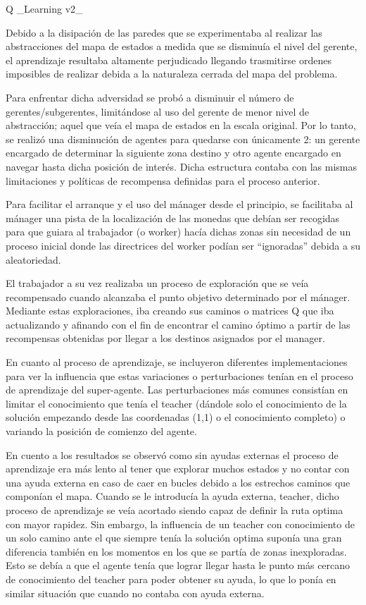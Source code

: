 \documentclass[letterpaper]{article} %
\begin{document}
Q _Learning  v2_

Debido a la disipación de las paredes que se experimentaba al realizar las abstracciones del mapa de estados a medida que se disminuía el nivel del gerente, el aprendizaje resultaba altamente perjudicado llegando trasmitirse ordenes imposibles de realizar debida a la naturaleza cerrada del mapa del problema.

Para enfrentar dicha adversidad se probó a disminuir el número de gerentes/subgerentes, limitándose al uso del gerente de menor nivel de abstracción; aquel que veía el mapa de estados en la escala original. Por lo tanto, se realizó una disminución de agentes para quedarse con únicamente 2: un gerente encargado de determinar la siguiente zona destino y otro agente encargado en navegar hasta dicha posición de interés. Dicha estructura contaba con las mismas limitaciones y políticas de recompensa definidas para el proceso anterior.


Para facilitar el arranque y el uso del mánager desde el principio, se facilitaba al mánager una pista de la localización de las monedas que debían ser recogidas para que guiara al trabajador (o worker) hacía dichas zonas sin necesidad de un proceso inicial donde las directrices del worker podían ser “ignoradas” debida a su aleatoriedad. 

El trabajador a su vez realizaba un proceso de exploración que se veía recompensado cuando alcanzaba el punto objetivo determinado por el mánager. Mediante estas exploraciones, iba creando sus caminos o matrices Q que iba actualizando y afinando con el fin de encontrar el camino óptimo a partir de las recompensas obtenidas por llegar a los destinos asignados por el manager.

En cuanto al proceso de aprendizaje, se incluyeron diferentes implementaciones para ver la influencia que estas variaciones o perturbaciones tenían en el proceso de aprendizaje del super-agente. Las perturbaciones más comunes consistían en limitar el conocimiento que tenía el teacher (dándole solo el conocimiento de la solución empezando desde las coordenadas (1,1) o el conocimiento completo) o variando la posición de comienzo del agente.

En cuento a los resultados se observó como sin ayudas externas el proceso de aprendizaje era más lento al tener que explorar muchos estados y no contar con una ayuda externa en caso de caer en bucles debido a los estrechos caminos que componían el mapa. Cuando se le introducía la ayuda externa, teacher, dicho proceso de aprendizaje se veía acortado siendo capaz de definir la ruta optima con mayor rapidez. Sin embargo, la influencia de un teacher con conocimiento de un solo camino ante el que siempre tenía la solución optima suponía una gran diferencia también en los momentos en los que se partía de zonas inexploradas. Esto se debía a que el agente tenía que lograr llegar hasta le punto más cercano de conocimiento del teacher para poder obtener su ayuda, lo que lo ponía en similar situación que cuando no contaba con ayuda externa.
\end{document}
